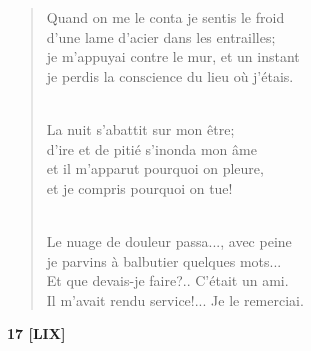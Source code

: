 \documentclass[a4paper,11pt]{book}
\begin{document}
\begin{verse}
Quand on me le conta je sentis le froid \\
d'une lame d'acier dans les entrailles; \\
je m'appuyai contre le mur, et un instant \\
je perdis la conscience du lieu où j'étais. \\ \

La nuit s'abattit sur mon être; \\
d'ire et de pitié s'inonda mon âme \\
et il m'apparut pourquoi on pleure, \\
et je compris pourquoi on tue! \\ \

Le nuage de douleur passa..., avec peine \\
je parvins à balbutier quelques mots... \\
Et que devais-je faire?.. C'était un ami. \\
Il m'avait rendu service!... Je le remerciai. \\
\end{verse}

\bigskip

\begin{center} {\bf 17 [LIX]} \end{center}
\end{document}
